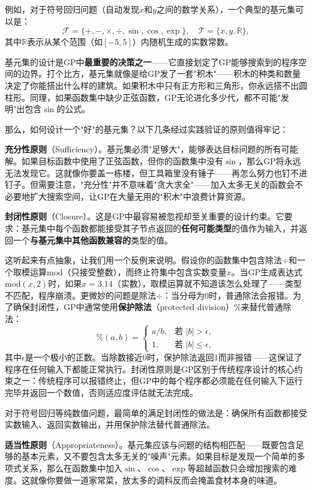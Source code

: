 \documentclass[lang=cn,zihao=-4,a4paper,fontset=windows]{beautybook}
\begin{document}
例如，对于符号回归问题（自动发现$x$和$y$之间的数学关系），一个典型的基元集可以是：
\[
\mathcal{F} = \{+, -, \times, \div, \sin, \cos, \exp\}, \quad \mathcal{T} = \{x, y, \mathbb{R}\},
\]
其中$\mathbb{R}$表示从某个范围（如$[-5, 5]$）内随机生成的实数常数。

基元集的设计是GP中\textbf{最重要的决策之一}——它直接划定了GP能够搜索到的程序空间的边界。打个比方，基元集就像是给GP发了一套"积木"——积木的种类和数量决定了你能搭出什么样的建筑。如果积木中只有正方形和三角形，你永远搭不出圆柱形。同理，如果函数集中缺少正弦函数，GP无论进化多少代，都不可能"发明"出包含$\sin$的公式。

那么，如何设计一个"好"的基元集？以下几条经过实践验证的原则值得牢记：

\textbf{充分性原则}（Sufficiency）。基元集必须"足够大"，能够表达目标问题的所有可能解。如果目标函数中使用了正弦函数，但你的函数集中没有$\sin$，那么GP将永远无法发现它。这就像你要盖一栋楼，但工具箱里没有锤子——再怎么努力也钉不进钉子。但需要注意，"充分性"并不意味着"贪大求全"——加入太多无关的函数会不必要地扩大搜索空间，让GP在大量无用的"积木"中浪费计算资源。

\textbf{封闭性原则}（Closure）。这是GP中最容易被忽视却至关重要的设计约束。它要求：基元集中每个函数都能接受其子节点返回的\textbf{任何可能类型}的值作为输入，并返回一个\textbf{与基元集中其他函数兼容的}类型的值。

这听起来有点抽象，让我们用一个反例来说明。假设你的函数集中包含除法$\div$和一个取模运算$\text{mod}$（只接受整数），而终止符集中包含实数变量$x$。当GP生成表达式$\text{mod}(x, 2)$时，如果$x = 3.14$（实数），取模运算就不知道该怎么处理了——类型不匹配，程序崩溃。更微妙的问题是除法$\div$：当分母为0时，普通除法会报错。为了确保封闭性，GP中通常使用\textbf{保护除法}（protected division）$\%$来替代普通除法：
\[
\%(a, b) = \begin{cases} a / b, & \text{若 } |b| > \epsilon, \\ 1, & \text{若 } |b| \leq \epsilon, \end{cases}
\]
其中$\epsilon$是一个极小的正数。当除数接近0时，保护除法返回1而非报错——这保证了程序在任何输入下都能正常执行。封闭性原则是GP区别于传统程序设计的核心约束之一：传统程序可以报错终止，但GP中的每个程序都必须能在任何输入下运行完毕并返回一个数值，否则适应度评估就无法完成。

对于符号回归等纯数值问题，最简单的满足封闭性的做法是：确保所有函数都接受实数输入、返回实数输出，并用保护除法替代普通除法。

\textbf{适当性原则}（Appropriateness）。基元集应该与问题的结构相匹配——既要包含足够的基本元素，又不要包含太多无关的"噪声"元素。如果目标是发现一个简单的多项式关系，那么在函数集中加入$\sin$、$\cos$、$\exp$等超越函数只会增加搜索的难度。这就像你要做一道家常菜，放太多的调料反而会掩盖食材本身的味道。
\end{document}
